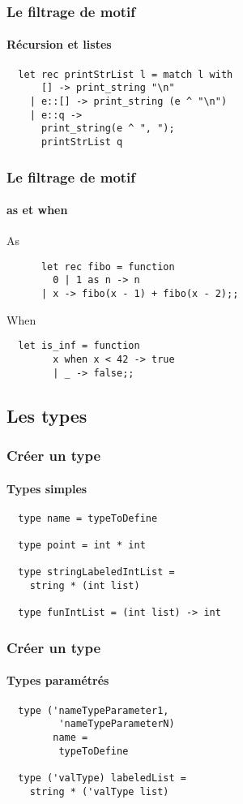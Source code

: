 \begin{frame}[fragile]
	\frametitle{Le filtrage de motif}
	\framesubtitle{Récursion et listes}
		\begin{lstlisting}
  let rec printStrList l = match l with
      [] -> print_string "\n"
    | e::[] -> print_string (e ^ "\n")
    | e::q -> 
      print_string(e ^ ", ");
      printStrList q
		\end{lstlisting}
\end{frame}

\begin{frame}[fragile]
  	\frametitle{Le filtrage de motif}
	\framesubtitle{as et when}
  	\begin{block}{As}
    	\begin{lstlisting}
	  let rec fibo = function 
 	    0 | 1 as n -> n 
 	  | x -> fibo(x - 1) + fibo(x - 2);; 
    	\end{lstlisting}
  	\end{block}
  	\begin{block}{When}
    	\begin{lstlisting}
  let is_inf = function 
        x when x < 42 -> true
    	| _ -> false;;
    	\end{lstlisting}
  	\end{block}
\end{frame}

\subsection{Les types} %
\begin{frame}[fragile]
	\frametitle{Créer un type}
	\framesubtitle{Types simples}
	\begin{lstlisting}
  type name = typeToDefine

  type point = int * int

  type stringLabeledIntList = 
    string * (int list)

  type funIntList = (int list) -> int
	\end{lstlisting}
\end{frame}

\begin{frame}[fragile]
	\frametitle{Créer un type}
	\framesubtitle{Types paramétrés}
	\begin{lstlisting}
  type ('nameTypeParameter1,
 	     'nameTypeParameterN) 
   	    name = 
         typeToDefine
    
  type ('valType) labeledList =
    string * ('valType list) 
	\end{lstlisting}
\end{frame}


